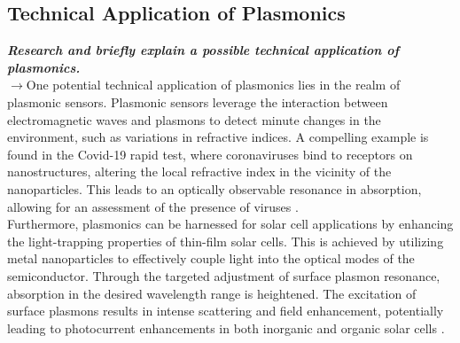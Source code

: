 \subsection{\label{subsec:FZV1}Technical Application of Plasmonics}
\textbf{\textit{Research and briefly explain a possible technical application of plasmonics.}}\\
$\rightarrow$One potential technical application of plasmonics lies in the realm of plasmonic sensors. 
Plasmonic sensors leverage the interaction between electromagnetic waves 
and plasmons to detect minute changes in the environment, such as variations in refractive indices. 
A compelling example is found in the Covid-19 rapid test, where coronaviruses bind to receptors on 
nanostructures, altering the local refractive index in the vicinity of the nanoparticles. 
This leads to an optically observable resonance in absorption, allowing for an assessment of 
the presence of viruses \cite{FZV1p1}. \\
Furthermore, plasmonics can be harnessed for solar cell applications by enhancing the light-trapping 
properties of thin-film solar cells. This is achieved by utilizing metal nanoparticles to effectively 
couple light into the optical modes of the semiconductor. Through the targeted adjustment of surface 
plasmon resonance, absorption in the desired wavelength range is heightened. The excitation of surface 
plasmons results in intense scattering and field enhancement, potentially leading to photocurrent 
enhancements in both inorganic and organic solar cells \cite{FZV1}. \\